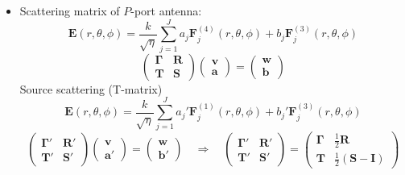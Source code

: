 \documentclass[a4paper,12pt]{article}
\renewcommand{\vec}[1]{\boldsymbol{#1}}
\newcommand{\mat}[1]{\mathbf{#1}}
\newcommand{\Ev}{\vec{E}}
\newcommand{\Fv}{\vec{F}}
\begin{document}
\begin{itemize}
\item Scattering matrix of $P$-port antenna:
  \begin{equation}
    \Ev(r,\theta,\phi) = \frac{k}{\sqrt{\eta}} \sum_{j=1}^{J} a_{j}\Fv_{j}^{(4)}(r,\theta,\phi) + b_{j}\Fv_{j}^{(3)}(r,\theta,\phi)
  \end{equation}
  \begin{equation}
    \begin{pmatrix}
      \boldsymbol{\Gamma} & \mat{R} \\
      \mat{T} & \mat{S} 
    \end{pmatrix}
    \begin{pmatrix}
      \vec{v} \\
      \vec{a}
    \end{pmatrix} =
    \begin{pmatrix}
      \vec{w} \\
      \vec{b}
    \end{pmatrix}
  \end{equation}
  Source scattering (T-matrix)
  \begin{equation}
    \Ev(r,\theta,\phi) = \frac{k}{\sqrt{\eta}} \sum_{j=1}^{J} a_{j}'\Fv_{j}^{(1)}(r,\theta,\phi) + b_{j}'\Fv_{j}^{(3)}(r,\theta,\phi)
  \end{equation}
  \begin{equation}
    \begin{pmatrix}
      \boldsymbol{\Gamma}' & \mat{R}' \\
      \mat{T}' & \mat{S}' 
    \end{pmatrix}
    \begin{pmatrix}
      \vec{v} \\
      \vec{a}'
    \end{pmatrix} =
    \begin{pmatrix}
      \vec{w} \\
      \vec{b}'
    \end{pmatrix} \quad\Rightarrow\quad
    \begin{pmatrix}
      \boldsymbol{\Gamma}' & \mat{R}' \\
      \mat{T}' & \mat{S}' 
    \end{pmatrix} = 
    \begin{pmatrix}
      \boldsymbol{\Gamma} & \frac{1}{2}\mat{R} \\
      \mat{T} & \frac{1}{2}(\mat{S}-\mat{I}) 
    \end{pmatrix}
  \end{equation}
\end{itemize}
\end{document}
